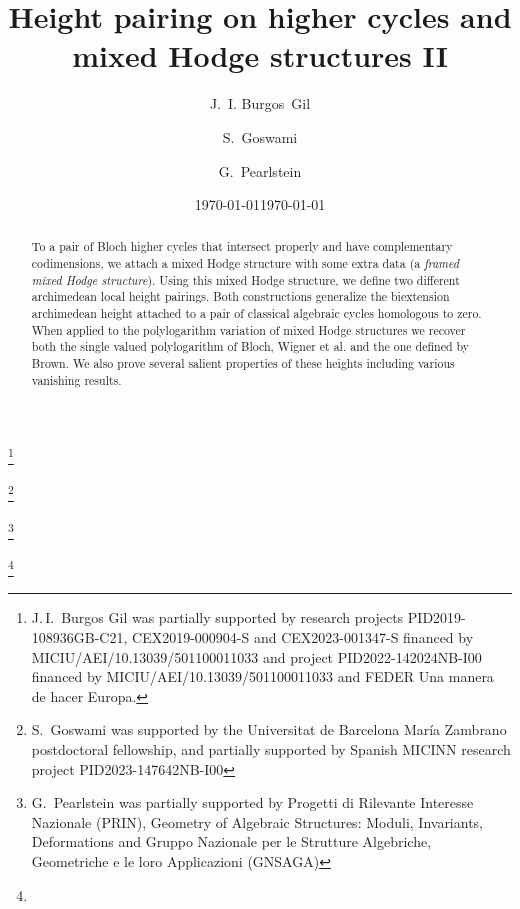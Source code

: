 \documentclass[11pt,a4paper]{amsart}
\numberwithin{equation}{section}
\theoremstyle{plain}
\theoremstyle{definition}
\begin{document}
\renewcommand\stackalignment{l}

\title{Height pairing on higher cycles and mixed Hodge structures II}

\author{J.~I. Burgos~Gil}
\thanks{J.\,I.~Burgos Gil was partially supported by research projects
  PID2019-108936GB-C21, 
 CEX2019-000904-S and CEX2023-001347-S financed
by  MICIU/AEI/10.13039/501100011033 and project  PID2022-142024NB-I00 financed
by  MICIU/AEI/10.13039/501100011033  and FEDER Una manera de hacer Europa.}
\address{Instituto de Ciencias Matem\'aticas (CSIC-UAM-UCM-UCM3).
  Calle Nicol\'as Ca\-bre\-ra~15, Campus UAM, Cantoblanco, 28049 Madrid,
  Spain} 

\author{S.~Goswami}
\thanks{S.~Goswami was supported by the Universitat de Barcelona Mar\'ia Zambrano postdoctoral fellowship, and partially supported by Spanish MICINN research project PID2023-147642NB-I00}

\address{Department of Mathematics and Informatics, University of Barcelona, Gran Via Corts Catalanes, 585, L'Eixample, 08007 Barcelona, Spain, and 3 Beni Master Lane, 700061 Kolkata, WB, India}

\author{G.~Pearlstein}

\address{Department of Mathematics, University of Pisa, Largo Bruno Pontecorvo, 5, 56127 Pisa PI}
\thanks{G.~Pearlstein was partially supported by Progetti di Rilevante Interesse Nazionale (PRIN), Geometry of Algebraic Structures: Moduli,
 Invariants, Deformations and Gruppo Nazionale per le Strutture Algebriche, Geometriche e le loro Applicazioni (GNSAGA)}
\date{\today}
\date{\today}

\newif\ifprivate
\privatetrue
\thanks{}

\begin{abstract}
  To a pair of Bloch higher cycles that intersect properly and have
  complementary codimensions, we attach a mixed Hodge structure with some
  extra data (a \emph{framed mixed Hodge structure}). Using 
  this mixed Hodge structure, we define two different archimedean
  local height pairings. Both constructions generalize the
  biextension archimedean height attached to a pair of classical algebraic cycles
  homologous to zero. When applied to the polylogarithm variation of mixed
  Hodge structures we recover both the single valued polylogarithm of  
  Bloch, Wigner et al. and the one defined by Brown. 
  We also prove several salient properties of
  these heights including various vanishing results.

  
\end{abstract}
\end{document}
